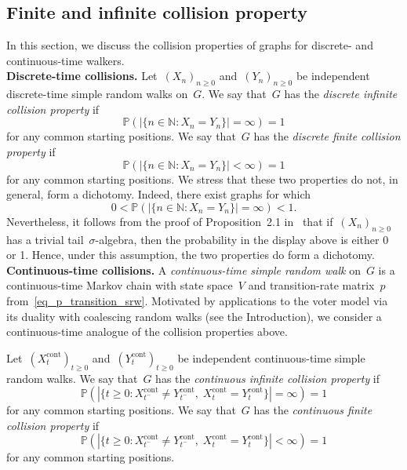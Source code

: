 \documentclass[a4paper,11pt]{article}
\newcommand{\PP}{\mathbb{P}}
\newcommand{\NN}{\mathbb{N}}
\theoremstyle{definition}
\begin{document}
\subsection{Finite and infinite collision property}\label{ss_collision_properties}
In this section, we discuss the collision properties of graphs for discrete- and continuous-time walkers. \\

\noindent \textbf{Discrete-time collisions.} Let~$(X_n)_{n \ge 0}$ and~$(Y_n)_{n \ge 0}$ be independent discrete-time simple random walks on~$G$. We say that~$G$ has the \emph{discrete infinite collision property} if
\begin{equation}\label{def_inf_coll_prop_disc}
    \PP( |\{ n \in \NN: X_n = Y_n \}| = \infty ) = 1
\end{equation}
for any common starting positions. We say that~$G$ has the \emph{discrete finite collision property} if
\begin{equation}\label{def_fin_coll_prop_disc}
    \PP( |\{ n \in \NN: X_n = Y_n \}| < \infty ) = 1
\end{equation}
for any common starting positions. We stress that these two properties do not, in general, form a dichotomy. Indeed, there exist graphs for which
$$ 0 < \PP( |\{ n \in \NN: X_n = Y_n \}| = \infty ) < 1.$$
Nevertheless, it follows from the proof of Proposition~2.1 in~\cite{BarlowPeresSousi2012} that if~$(X_n)_{n \ge 0}$ has a trivial tail~$\sigma$-algebra, then the probability in the display above is either 0 or 1. Hence, under this assumption, the two properties do form a dichotomy.\\

\noindent \textbf{Continuous-time collisions.} A \emph{continuous-time simple random walk} on~$G$ is a continuous-time Markov chain with state space~$V$ and transition-rate matrix~$p$ from~\eqref{eq_p_transition_srw}. Motivated by applications to the voter model via its duality with coalescing random walks (see the Introduction), we consider a continuous-time analogue of the collision properties above. 

Let~$(X^\mathrm{cont}_t)_{t \ge 0}$ and~$(Y^\mathrm{cont}_t)_{t \ge 0}$ be independent continuous-time simple random walks. We say that~$G$ has the \emph{continuous infinite collision property} if 
\begin{equation}\label{def_inf_coll_prop_cont}
    \PP( |\{ t \ge 0: X^\mathrm{cont}_{t^-} \neq Y^\mathrm{cont}_{t^-},\; X^\mathrm{cont}_t = Y^\mathrm{cont}_t \}| = \infty ) = 1
\end{equation}
for any common starting positions. We say that~$G$ has the \emph{continuous finite collision property} if
\begin{equation}\label{def_fin_coll_prop_cont}
    \PP( |\{ t \ge 0: X^\mathrm{cont}_{t^-} \neq Y^\mathrm{cont}_{t^-},\; X^\mathrm{cont}_t = Y^\mathrm{cont}_t \}| < \infty ) = 1
\end{equation}
for any common starting positions.
\end{document}
